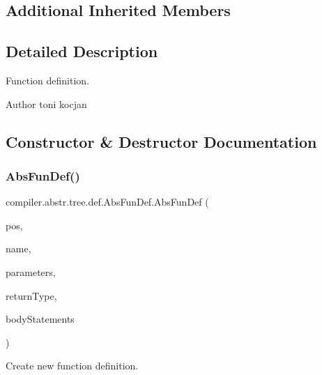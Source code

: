 \subsection*{Additional Inherited Members}


\subsection{Detailed Description}
Function definition.

\begin{DoxyAuthor}{Author}
toni kocjan 
\end{DoxyAuthor}


\subsection{Constructor \& Destructor Documentation}
\mbox{\label{classcompiler_1_1abstr_1_1tree_1_1def_1_1_abs_fun_def_a96d17ff75e88ca4392aaa339fb09fae1}} 
\subsubsection{\texorpdfstring{Abs\+Fun\+Def()}{AbsFunDef()}\hspace{0.1cm}{\footnotesize\ttfamily [1/3]}}
{\footnotesize\ttfamily compiler.\+abstr.\+tree.\+def.\+Abs\+Fun\+Def.\+Abs\+Fun\+Def (\begin{DoxyParamCaption}\item[{\hyperlink{classcompiler_1_1_position}{Position}}]{pos,  }\item[{String}]{name,  }\item[{Linked\+List$<$ \hyperlink{classcompiler_1_1abstr_1_1tree_1_1def_1_1_abs_par_def}{Abs\+Par\+Def} $>$}]{parameters,  }\item[{\hyperlink{classcompiler_1_1abstr_1_1tree_1_1type_1_1_abs_type}{Abs\+Type}}]{return\+Type,  }\item[{\hyperlink{classcompiler_1_1abstr_1_1tree_1_1_abs_stmts}{Abs\+Stmts}}]{body\+Statements }\end{DoxyParamCaption})}

Create new function definition.


